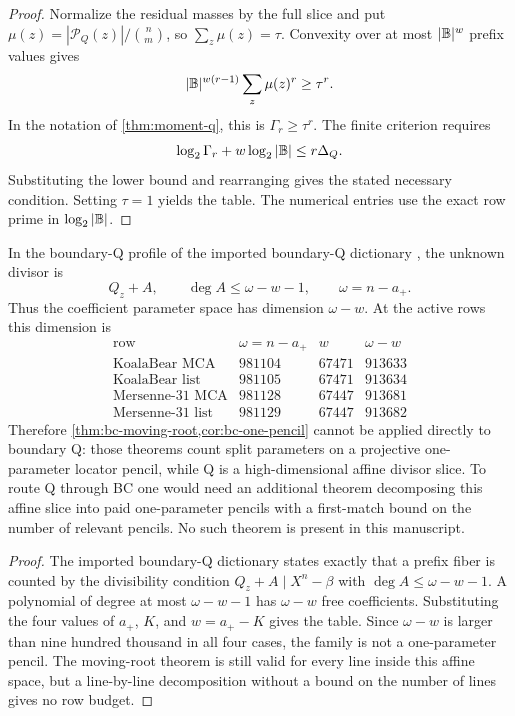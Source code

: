 \documentclass[11pt,a4paper]{amsart}
\numberwithin{equation}{section}
\theoremstyle{remark}
\begin{document}
\begin{proof}
Normalize the residual masses by the full slice and put
\(\mu(z)=|\mathcal P_Q(z)|/\binom nm\), so \(\sum_z\mu(z)=\tau\).  Convexity over at most \(|\mathbb B|^w\) prefix values gives
\[
        |\mathbb B|^{w(r-1)}\sum_z\mu(z)^r\ge\tau^r.
\]
In the notation of \cref{thm:moment-q}, this is \(\Gamma_r\ge\tau^r\).  The finite criterion requires
\[
        \log_2\Gamma_r+w\log_2|\mathbb B|\le r\Delta_Q .
\]
Substituting the lower bound and rearranging gives the stated necessary condition.  Setting \(\tau=1\) yields the table.  The numerical entries use the exact row prime in \(\log_2|\mathbb B|\).
\end{proof}

\begin{proposition}\label{prop:bc-not-q}
In the boundary-Q profile of the imported boundary-Q dictionary \cite[Secs.~18--21]{CAP25v132}, the unknown divisor is
\[
        Q_z+A,
        \qquad
        \deg A\le \omega-w-1,
        \qquad
        \omega=n-a_+ .
\]
Thus the coefficient parameter space has dimension \(\omega-w\).  At the active rows this dimension is
\[
\begin{array}{c|r|r|r}
\text{row} & \omega=n-a_+ & w & \omega-w\\
\hline
\text{KoalaBear MCA} & 981104 & 67471 & 913633\\
\text{KoalaBear list} & 981105 & 67471 & 913634\\
\text{Mersenne-31 MCA} & 981128 & 67447 & 913681\\
\text{Mersenne-31 list} & 981129 & 67447 & 913682
\end{array}
\]
Therefore \cref{thm:bc-moving-root,cor:bc-one-pencil} cannot be applied directly to boundary Q: those theorems count split parameters on a projective one-parameter locator pencil, while Q is a high-dimensional affine divisor slice.  To route Q through BC one would need an additional theorem decomposing this affine slice into paid one-parameter pencils with a first-match bound on the number of relevant pencils.  No such theorem is present in this manuscript.
\end{proposition}

\begin{proof}
The imported boundary-Q dictionary \cite[Secs.~18--21]{CAP25v132} states exactly that a prefix fiber is counted by the divisibility condition \(Q_z+A\mid X^n-\beta\) with \(\deg A\le\omega-w-1\).  A polynomial of degree at most \(\omega-w-1\) has \(\omega-w\) free coefficients.  Substituting the four values of \(a_+\), \(K\), and \(w=a_+-K\) gives the table.  Since \(\omega-w\) is larger than nine hundred thousand in all four cases, the family is not a one-parameter pencil.  The moving-root theorem is still valid for every line inside this affine space, but a line-by-line decomposition without a bound on the number of lines gives no row budget.
\end{proof}
\end{document}

